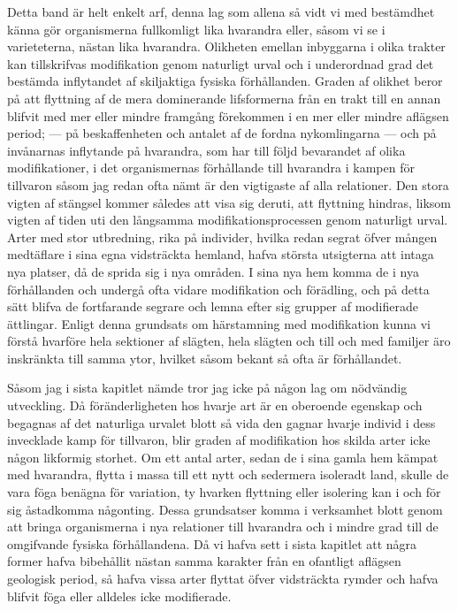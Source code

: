 Detta band är helt enkelt arf, denna lag som allena så vidt vi med bestämdhet känna gör organismerna fullkomligt lika hvarandra eller, såsom vi se i varieteterna, nästan lika hvarandra. Olikheten emellan inbyggarna i olika trakter kan tillskrifvas modifikation genom naturligt urval och i underordnad grad det bestämda inflytandet af skiljaktiga fysiska förhållanden. Graden af olikhet beror på att flyttning af de mera dominerande lifsformerna från en trakt till en annan blifvit med mer eller mindre framgång förekommen i en mer eller mindre aflägsen period; — på beskaffenheten och antalet af de fordna nykomlingarna — och på invånarnas inflytande på hvarandra, som har till följd bevarandet af olika modifikationer, i det organismernas förhållande till hvarandra i kampen för tillvaron såsom jag redan ofta nämt är den vigtigaste af alla relationer. Den stora vigten af stängsel kommer således att visa sig deruti, att flyttning hindras, liksom vigten af tiden uti den långsamma modifikationsprocessen genom naturligt urval. Arter med stor utbredning, rika på individer, hvilka redan segrat öfver mången medtäflare i sina egna vidsträckta hemland, hafva största utsigterna att intaga nya platser, då de sprida sig i nya områden. I sina nya hem komma de i nya förhållanden och undergå ofta vidare modifikation och förädling, och på detta sätt blifva de fortfarande segrare och lemna efter sig grupper af modifierade ättlingar. Enligt denna grundsats om härstamning med modifikation kunna vi förstå hvarföre hela sektioner af slägten, hela slägten och till och med familjer äro inskränkta till samma ytor, hvilket såsom bekant så ofta är förhållandet.

Såsom jag i sista kapitlet nämde tror jag icke på någon lag om nödvändig utveckling. Då föränderligheten hos hvarje art är en oberoende egenskap och begagnas af det naturliga urvalet blott så vida den gagnar hvarje individ i dess invecklade kamp för tillvaron, blir graden af modifikation hos skilda arter icke någon likformig storhet. Om ett antal arter, sedan de i sina gamla hem kämpat med hvarandra, flytta i massa till ett nytt och sedermera isoleradt land, skulle de vara föga benägna för variation, ty hvarken flyttning eller isolering kan i och för sig åstadkomma någonting. Dessa grundsatser komma i verksamhet blott genom att bringa organismerna i nya relationer till hvarandra och i mindre grad till de omgifvande fysiska förhållandena. Då vi hafva sett i sista kapitlet att några former hafva bibehållit nästan samma karakter från en ofantligt aflägsen geologisk period, så hafva vissa arter flyttat öfver vidsträckta rymder och hafva blifvit föga eller alldeles icke modifierade.

